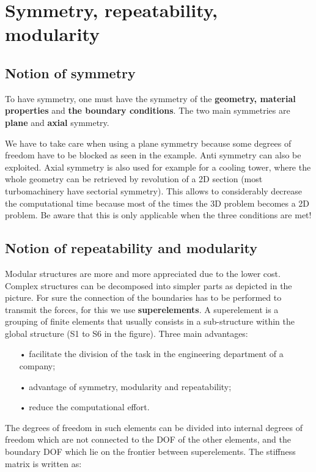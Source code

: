 
\chapter{Symmetry, repeatability, modularity}
\section{Notion of symmetry}
	To have symmetry, one must have the symmetry of the \textbf{geometry, material properties} and \textbf{the boundary conditions}. The two main symmetries are \textbf{plane} and \textbf{axial} symmetry. 
	
	We have to take care when using a plane symmetry because some degrees of freedom have to be blocked as seen in the example. Anti symmetry can also be exploited. Axial symmetry is also used for example for a cooling tower, where the whole geometry can be retrieved by revolution of a 2D section (most turbomachinery have sectorial symmetry). This allows to considerably decrease the computational time because most of the times the 3D problem becomes a 2D problem. Be aware that this is only applicable when the three conditions are met! 
	
\section{Notion of repeatability and modularity}
	Modular structures are more and more appreciated due to the lower cost. Complex structures can be decomposed into simpler parts as depicted in the picture. For sure the connection of the boundaries has to be performed to transmit the forces, for this we use \textbf{superelements}. A superelement is a grouping of finite elements that usually consists in a sub-structure within the global structure (S1 to S6 in the figure). Three main advantages: \\
	
	\begin{itemize}
	\item[•]	facilitate the division of the task in the engineering department of a company; 
	\item[•] advantage of symmetry, modularity and repeatability; 
	\item[•] reduce the computational effort. \\
	\end{itemize}
	
	The degrees of freedom in such elements can be divided into internal degrees of freedom which are not connected to the DOF of the other elements, and the boundary DOF which lie on the frontier between superelements. The stiffness matrix is written as: 
	
